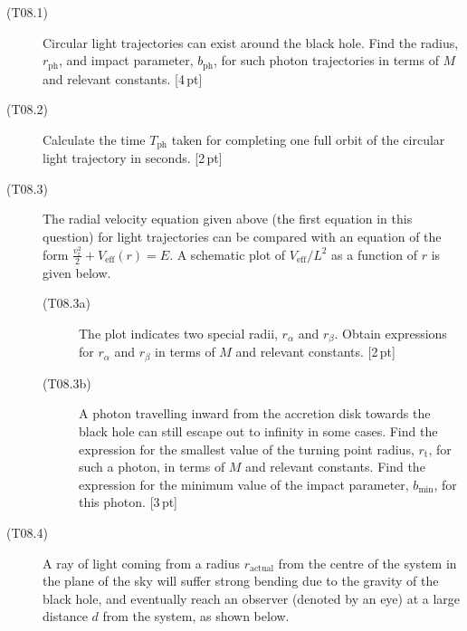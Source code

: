 \begin{description}
\item[(T08.1)] Circular light trajectories can exist around the black hole.
  Find the radius, $r_{\mathrm{ph}}$, and impact parameter,
  $b_{\mathrm{ph}}$, for such photon trajectories in terms of $M$ and relevant
  constants. \hfill[4\,pt]
\item[(T08.2)] Calculate the time $T_{\mathrm{ph}}$ taken for completing one
  full orbit of the circular light trajectory in seconds. \hfill[2\,pt]
\item[(T08.3)] The radial velocity equation given above (the first equation in
  this question) for light trajectories can be compared with an equation of
  the form $\frac{v_{\mathrm{r}}^2}{2} + V_{\mathrm{eff}}(r) = E$. A schematic
  plot of $V_{\mathrm{eff}}/L^2$ as a function of $r$ is given below.


  \begin{description}
  \item[(T08.3a)] The plot indicates two special radii, $r_\alpha$ and
    $r_\beta$. Obtain expressions for $r_\alpha$ and $r_\beta$ in terms of $M$
    and relevant constants. \hfill[2\,pt]
  \item[(T08.3b)] A photon travelling inward from the accretion disk towards
    the black hole can still escape out to infinity in some cases. Find the
    expression for the smallest value of the turning point radius,
    $r_{\mathrm{t}}$, for such a photon, in terms of $M$ and relevant
    constants. Find the expression for the minimum value of the impact
    parameter, $b_{\mathrm{min}}$, for this photon. \hfill[3\,pt]
  \end{description}
\item[(T08.4)] A ray of light coming from a radius $r_{\mathrm{actual}}$ from
  the centre of the system in the plane of the sky will suffer strong bending
  due to the gravity of the black hole, and eventually reach an observer
  (denoted by an eye) at a large distance $d$ from the system, as shown below.



\end{description}
